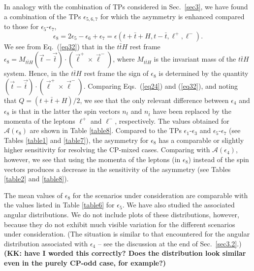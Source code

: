 \documentclass[aps,preprint,tightenlines,floatfix,superscriptaddress,nofootinbib,showpacs]{revtex4-1}
\def\beq{\begin{equation}}
\def\eeq{\end{equation}}
\def\tbar{\bar{t}}
\begin{document}
In analogy with the
combination of TPs considered in Sec.~\ref{sec3}, we have found a
combination of the TPs $\epsilon_{5,6,7}$ for which the asymmetry is
enhanced compared to those for $\epsilon_5$-$\epsilon_7$,
%
\beq
\label{eq32}
\epsilon_8 = 2\epsilon_5 -\epsilon_6 +\epsilon_7 = \epsilon(t+\tbar+H,t-\tbar,\ell^+,\ell^-).
\eeq
%
We see from Eq.~(\ref{eq32}) that in the $t\tbar H$ rest frame
$\epsilon_8=M_{t\tbar H}(\vec{t}-\vec{\tbar})\cdot (\vec{\ell}^+\!
\times \vec{\ell}^-)$, where $M_{t\tbar H}$ is the invariant mass of
the $t\tbar H$ system. Hence, in the $t\tbar H$ rest frame the sign of 
$\epsilon_8$ is determined by the quantity
$(\vec{t}-\vec{\tbar})\cdot (\vec{\ell}^+\! \times
\vec{\ell}^-)$. Comparing Eqs.~(\ref{eq24}) and (\ref{eq32}),
and noting that $Q=(t+\tbar+H)/2$, we see that the only
relevant difference between $\epsilon_4$ and $\epsilon_8$ is that in
the latter the spin vectors $n_t$ and $n_{\tbar}$ have been replaced
by the momenta of the leptons $\ell^+$ and $\ell^-$, respectively. The
values obtained for $\mathcal{A}(\epsilon_8)$ are shown in Table
\ref{table8}. Compared to the TPs $\epsilon_1$-$\epsilon_3$ and
$\epsilon_5$-$\epsilon_7$ (see Tables \ref{table1} and \ref{table7}),
the asymmetry for $\epsilon_8$ has a comparable or slightly higher
sensitivity for resolving the $\mathrm{CP}$-mixed cases.
Comparing with $\mathcal{A}(\epsilon_4)$, however,
we see that using the momenta of the leptons (in $\epsilon_8$)
instead of the spin vectors produces a decrease in the sensitivity of
the asymmetry (see Tables \ref{table2} and
\ref{table8}).

The mean values of $\epsilon_8$ for the scenarios under
consideration are comparable with the values listed in Table
\ref{table6} for $\epsilon_5$.
We have also studied the associated angular distributions.
We do not include plots of these distributions, however,
because they
do not exhibit much visible variation for the different
scenarios under consideration.  (The situation is similar
to that encountered for the angular distribution
associated with $\epsilon_4$ -- see the discussion
at the end of Sec.~\ref{sec3.2}.)
{\bf (KK: have I worded this correctly?
  Does the distribution look similar even in the
  purely CP-odd case, for example?)}
\end{document}
